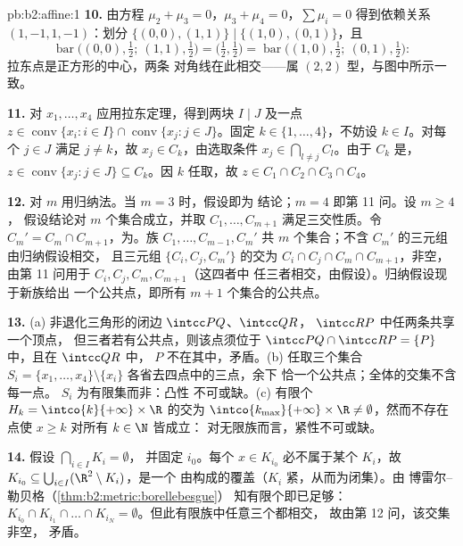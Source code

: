 \begin{solution}{pb:b2:affine:1}
\textbf{10.} 由方程 $\mu_2 + \mu_3 = 0$，$\mu_3 +
\mu_4 = 0$，$\sum\mu_i = 0$ 得到依赖关系 $(1, -1, 1,
-1)$：划分 $\{(0,0), (1,1)\} \mid \{(1,0), (0,1)\}$，且
\[
\operatorname{bar}\bigl((0,0), \tfrac12;\ (1,1),
\tfrac12\bigr) = \bigl(\tfrac12, \tfrac12\bigr) =
\operatorname{bar}\bigl((1,0), \tfrac12;\ (0,1),
\tfrac12\bigr) :
\]
拉东点是正方形的中心，两条
对角线在此相交——属 $(2,2)$ 型，与图中所示一致。

\textbf{11.} 对 $x_1, \dots, x_4$ 应用拉东定理，得到两块
$I \mid J$ 及一点 $z \in \operatorname{conv}\{x_i : i
\in I\} \cap \operatorname{conv}\{x_j : j \in J\}$。固定 $k
\in \{1, \dots, 4\}$，不妨设 $k \in I$。对每个 $j \in J$
满足 $j \neq k$，故 $x_j \in C_k$，由选取条件 $x_j \in
\bigcap_{l \neq j}C_l$。由于 $C_k$ 是，$z \in
\operatorname{conv}\{x_j : j \in J\} \subseteq C_k$。因 $k$
任取，故 $z \in C_1 \cap C_2 \cap C_3 \cap C_4$。

\textbf{12.} 对 $m$ 用归纳法。当 $m = 3$ 时，假设即为
结论；$m = 4$ 即第 11 问。设 $m \geq 4$，
假设结论对 $m$ 个集合成立，并取 $C_1, \dots,
C_{m+1}$ 满足三交性质。令 $C_m' =
C_m \cap C_{m+1}$，为。族 $C_1, \dots, C_{m-1},
C_m'$ 共 $m$ 个集合；不含 $C_m'$ 的三元组由归纳假设相交，
且三元组 $\{C_i, C_j, C_m'\}$ 的交为
$C_i \cap C_j \cap C_m \cap C_{m+1}$，非空，
由第 11 问用于 $C_i, C_j, C_m, C_{m+1}$（这四者中
任三者相交，由假设）。归纳假设现于新族给出
一个公共点，即所有 $m+1$
个集合的公共点。

\textbf{13.} (a) 非退化三角形的闭边 $\intcc PQ$、$\intcc QR$，
$\intcc RP$ 中任两条共享一个顶点，
但三者若有公共点，则该点须位于 $\intcc
PQ \cap \intcc RP = \{P\}$ 中，且在 $\intcc QR$ 中，
$P$ 不在其中，矛盾。(b) 任取三个集合 $S_i = \{x_1, \dots, x_4\}
\setminus \{x_i\}$ 各省去四点中的三点，余下
恰一个公共点；全体的交集不含每一点。
$S_i$ 为有限集而非：凸性
不可或缺。(c) 有限个 $H_k = \intco{k}{+\infty} \times
\R$ 的交为 $\intco{k_{\max}}{+\infty} \times \R \neq
\emptyset$，然而不存在点使 $x \geq k$ 对所有 $k \in \N$ 皆成立：
对无限族而言，紧性不可或缺。

\textbf{14.} 假设 $\bigcap_{i \in I}K_i = \emptyset$，
并固定 $i_0$。每个 $x \in K_{i_0}$ 必不属于某个 $K_i$，故
$K_{i_0} \subseteq \bigcup_{i \in I}(\R^2 \setminus K_i)$，是一个
由构成的覆盖（$K_i$ 紧，从而为闭集）。由
博雷尔--勒贝格（\cref{thm:b2:metric:borellebesgue}）
知有限个即已足够：$K_{i_0} \cap K_{i_1} \cap \dots \cap K_{i_N} =
\emptyset$。但此有限族中任意三个都相交，
故由第 12 问，该交集非空，
矛盾。


\end{solution}
